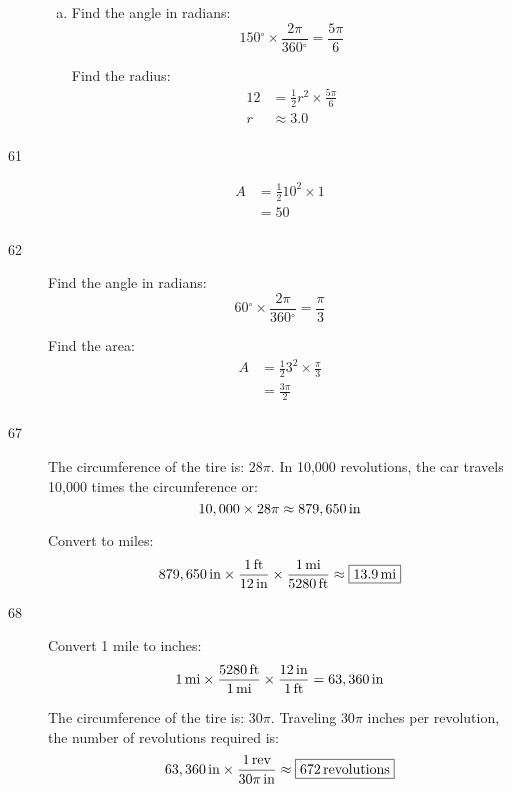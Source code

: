\documentclass{exam}
\newcommand{\degree}{\ensuremath{^\circ}}
\begin{document}
\begin{description}
\begin{enumerate}[(a)]
          \item 
            Find the angle in radians:
            \[
              150 \degree \times \frac{2 \pi}{360 \degree} = \frac{5 \pi}{6}
            \]

            Find the radius:
            \begin{align*}
              12 & = \frac{1}{2} r^2 \times \frac{5 \pi}{6} \\
              r  & \approx \boxed{ 3.0 } \\
            \end{align*}

        \end{enumerate}

      \item[61]
        \begin{align*}
          A & = \frac{1}{2} 10^2 \times 1 \\
            & = \boxed{ 50 } \\
        \end{align*}

      \item[62]
        Find the angle in radians:
        \[
          60 \degree \times \frac{2 \pi}{360 \degree} = \frac{\pi}{3}
        \]

        Find the area:
        \begin{align*}
          A & = \frac{1}{2} 3^2 \times \frac{\pi}{3} \\
            & = \boxed{ \frac{3 \pi}{2} } \\
        \end{align*}

      \item[67]
        The circumference of the tire is: $28 \pi$.  In 10,000 revolutions, the
        car travels 10,000 times the circumference or:
        \[
          10,000 \times 28 \pi \approx \unit[ 879,650 ]{in}
        \]

        Convert to miles:
        \[
          \unit[ 879,650 ]{in} \times \frac{ \unit[1]{ft} }{ \unit[12]{in}} \times \frac{ \unit[1]{mi} }{ \unit[5280]{ft} } \approx \boxed{ \unit[13.9]{mi} }
        \]

      \item[68]
        Convert 1 mile to inches:
        \[
          \unit[ 1 ]{mi} \times \frac{ \unit[5280]{ft} }{ \unit[1]{mi}} \times \frac{ \unit[12]{in} }{ \unit[1]{ft} } = \unit[63,360]{in}
        \]

        The circumference of the tire is: $30 \pi$.  Traveling $30 \pi$ inches per revolution, the number of revolutions required is:
        \[
          \unit[63,360]{in} \times \frac{\unit[1]{rev}}{\unit[30 \pi]{in}} \approx \boxed{ \unit[672]{revolutions} }
        \]


\end{description}
\end{document}
